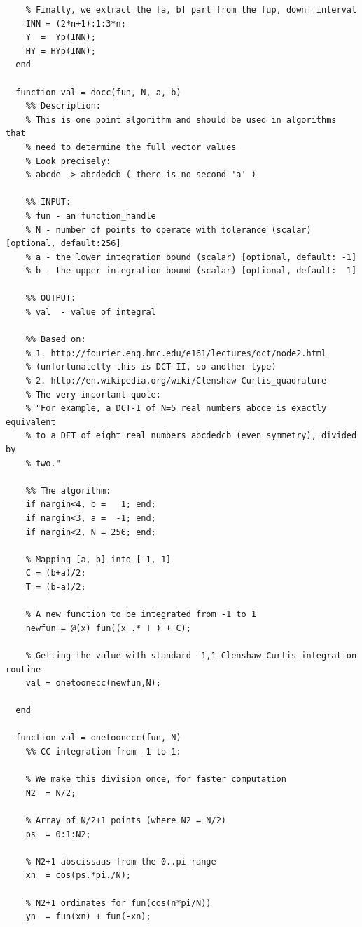 \documentclass[12pt,twoside,a4paper]{article}
\numberwithin{equation}{subsection}
\numberwithin{figure}{subsection}
\begin{document}
\begin{lstlisting}
    % Finally, we extract the [a, b] part from the [up, down] interval
    INN = (2*n+1):1:3*n;
    Y  =  Yp(INN); 
    HY = HYp(INN); 
  end
	
  function val = docc(fun, N, a, b)
    %% Description:
    % This is one point algorithm and should be used in algorithms that
    % need to determine the full vector values
    % Look precisely:
    % abcde -> abcdedcb ( there is no second 'a' )

    %% INPUT:
    % fun - an function_handle 
    % N - number of points to operate with tolerance (scalar) [optional, default:256]
    % a - the lower integration bound (scalar) [optional, default: -1]
    % b - the upper integration bound (scalar) [optional, default:  1]

    %% OUTPUT:
    % val  - value of integral

    %% Based on:
    % 1. http://fourier.eng.hmc.edu/e161/lectures/dct/node2.html
    % (unfortunatelly this is DCT-II, so another type)
    % 2. http://en.wikipedia.org/wiki/Clenshaw-Curtis_quadrature
    % The very important quote: 
    % "For example, a DCT-I of N=5 real numbers abcde is exactly equivalent
    % to a DFT of eight real numbers abcdedcb (even symmetry), divided by
    % two."

    %% The algorithm:
    if nargin<4, b =   1; end;
    if nargin<3, a =  -1; end;
    if nargin<2, N = 256; end;

    % Mapping [a, b] into [-1, 1]
    C = (b+a)/2;
    T = (b-a)/2;

    % A new function to be integrated from -1 to 1    
    newfun = @(x) fun((x .* T ) + C);

    % Getting the value with standard -1,1 Clenshaw Curtis integration routine
    val = onetoonecc(newfun,N);

  end
	    
  function val = onetoonecc(fun, N)
    %% CC integration from -1 to 1:

    % We make this division once, for faster computation
    N2  = N/2;                                           

    % Array of N/2+1 points (where N2 = N/2)
    ps  = 0:1:N2;                                        

    % N2+1 abscissaas from the 0..pi range
    xn  = cos(ps.*pi./N);                                

    % N2+1 ordinates for fun(cos(n*pi/N))
    yn  = fun(xn) + fun(-xn);                            


\end{lstlisting}
\end{document}
